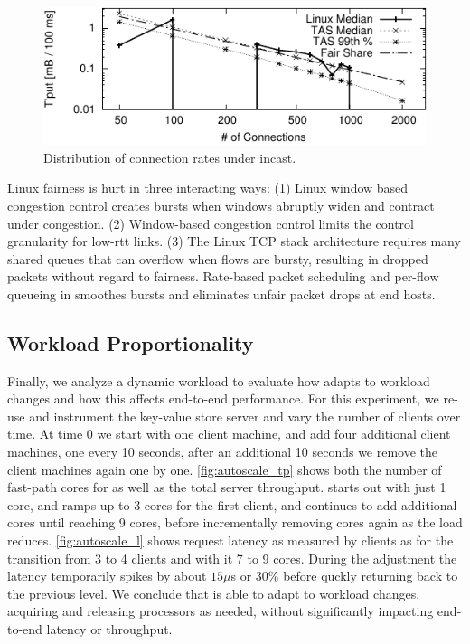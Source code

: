 \begin{figure}
  \centering
  \includegraphics[width=\columnwidth]{plots/fairness_new/fairness.pdf}
  \caption{Distribution of connection rates under incast.}
  \label{fig:fairness}
\end{figure}

Linux fairness is hurt in three interacting ways: (1) Linux window
based congestion control creates bursts when windows abruptly widen
and contract under congestion. (2) Window-based congestion control
limits the control granularity for low-rtt links.  (3) The Linux TCP
stack architecture requires many shared queues that can overflow when
flows are bursty, resulting in dropped packets without regard to
fairness. Rate-based packet scheduling and per-flow queueing in
\rmttcp smoothes bursts and eliminates unfair packet drops at end
hosts.


\subsection{Workload Proportionality}
Finally, we analyze a dynamic workload to evaluate how \rmttcp adapts to
workload changes and how this affects end-to-end performance.
For this experiment, we re-use and instrument the key-value store server and
vary the number of clients over time.
At time 0 we start with one client machine, and add four additional client
machines, one every 10 seconds, after an additional 10 seconds we remove the
client machines again one by one.
\autoref{fig:autoscale_tp} shows both the number of fast-path cores for \rmttcp
as well as the total server throughput.
\rmttcp starts out with just 1 core, and ramps up to 3 cores for the first
client, and continues to add additional cores until reaching 9 cores, before
incrementally removing cores again as the load reduces.
\autoref{fig:autoscale_l} shows request latency as measured by clients as for
the transition from 3 to 4 clients and with it 7 to 9 cores.
During the adjustment the latency temporarily spikes by about $15\mu$s or 30\%
before quckly returning back to the previous level.
We conclude that \rmttcp is able to adapt to workload changes, acquiring and
releasing processors as needed, without significantly impacting end-to-end
latency or throughput.

